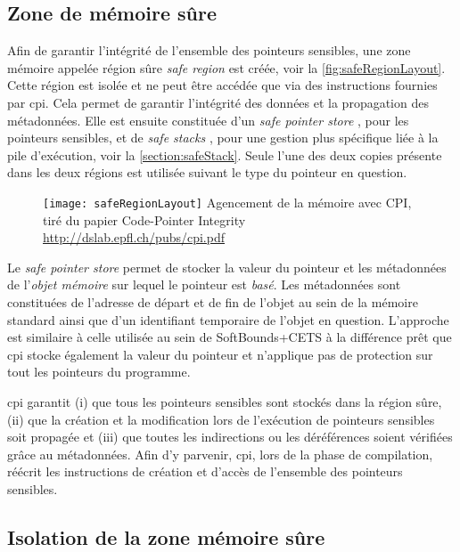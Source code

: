 \subsection{Zone de mémoire sûre}
\label{subsection:zoneMemoireSure}

Afin de garantir l'intégrité de l'ensemble des pointeurs sensibles, une zone mémoire appelée région sûre \og \textit{safe region} \fg est créée, voir la \autoref{fig:safeRegionLayout}. Cette région est isolée et ne peut être accédée que via des instructions fournies par \gls{cpi}. Cela permet de garantir l'intégrité des données et la propagation des métadonnées. Elle est ensuite constituée d'un \og \textit{safe pointer store} \fg, pour les pointeurs sensibles, et de \og \textit{safe stacks} \fg, pour une gestion plus spécifique liée à la pile d'exécution, voir la \autoref{section:safeStack}. Seule l'une des deux copies présente dans les deux régions est utilisée suivant le type du pointeur en question.

\begin{figure}[H]
	\centering
	\texttt{[image: safeRegionLayout]}
	{Agencement de la mémoire avec CPI, tiré du papier Code-Pointer Integrity}
	{\url{http://dslab.epfl.ch/pubs/cpi.pdf}}
	\label{fig:safeRegionLayout}
\end{figure}

Le \og \textit{safe pointer store} \fg permet de stocker la valeur du pointeur et les métadonnées de l'\textit{objet mémoire} sur lequel le pointeur est \textit{basé}. Les métadonnées sont constituées de l'adresse de départ et de fin de l'objet au sein de la mémoire standard ainsi que d'un identifiant temporaire de l'objet en question. L'approche est similaire à celle utilisée au sein de SoftBounds+CETS \cite{SoftBound} à la différence prêt que \gls{cpi} stocke également la valeur du pointeur et n'applique pas de protection sur tout les pointeurs du programme.

\gls{cpi} garantit (i) que tous les pointeurs sensibles sont stockés dans la région sûre, (ii) que la création et la modification lors de l'exécution de pointeurs sensibles soit propagée et (iii) que toutes les indirections ou les déréférences soient vérifiées grâce au métadonnées. Afin d'y parvenir, \gls{cpi}, lors de la phase de compilation, réécrit les instructions de création et d'accès de l'ensemble des pointeurs sensibles.


\subsection{Isolation de la zone mémoire sûre}
\label{subsection:isolationZoneMemoire}

